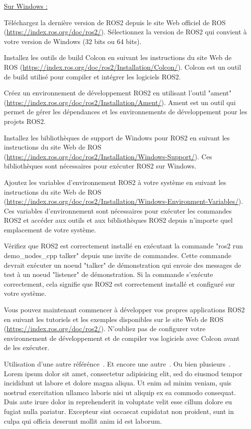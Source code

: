  \underline{Sur Windows :}
 
 
Téléchargez la dernière version de ROS2 depuis le site Web officiel de ROS (\url{https://index.ros.org/doc/ros2/}). Sélectionnez la version de ROS2 qui convient à votre version de Windows (32 bits ou 64 bits). 
 
Installez les outils de build Colcon en suivant les instructions du site Web de ROS (\url{https://index.ros.org/doc/ros2/Installation/Colcon/}). Colcon est un outil de build utilisé pour compiler et intégrer les logiciels ROS2. 
 
Créez un environnement de développement ROS2 en utilisant l'outil "ament" (\url{https://index.ros.org/doc/ros2/Installation/Ament/}). Ament est un outil qui permet de gérer les dépendances et les environnements de développement pour les projets ROS2. 
 
Installez les bibliothèques de support de Windows pour ROS2 en suivant les instructions du site Web de ROS (\url{https://index.ros.org/doc/ros2/Installation/Windows-Support/}). Ces bibliothèques sont nécessaires pour exécuter ROS2 sur Windows. 
 
Ajoutez les variables d'environnement ROS2 à votre système en suivant les instructions du site Web de ROS (\url{https://index.ros.org/doc/ros2/Installation/Windows-Environment-Variables/}). Ces variables d'environnement sont nécessaires pour exécuter les commandes ROS2 et accéder aux outils et aux bibliothèques ROS2 depuis n'importe quel emplacement de votre système. 
 
Vérifiez que ROS2 est correctement installé en exécutant la commande "ros2 run demo\_nodes\_cpp talker" depuis une invite de commandes. Cette commande devrait exécuter un noeud "talker" de démonstration qui envoie des messages de test à un noeud "listener" de démonstration. Si la commande s'exécute correctement, cela signifie que ROS2 est correctement installé et configuré sur votre système. 
 
Vous pouvez maintenant commencer à développer vos propres applications ROS2 en suivant les tutoriels et les exemples disponibles sur le site Web de ROS (\url{https://index.ros.org/doc/ros2/}). N'oubliez pas de configurer votre environnement de développement et de compiler vos logiciels avec Colcon avant de les exécuter. 
 

Utilisation d'une autre référénce~\cite{NOM05}. Et encore une autre~\cite{NOM12}. Ou bien plusieurs~\cite{WEB13, NOM09, NOM07}.
Lorem ipsum dolor sit amet, consectetur adipisicing elit, sed do eiusmod tempor incididunt ut labore et dolore magna aliqua. Ut enim ad minim veniam, quis nostrud exercitation ullamco laboris nisi ut aliquip ex ea commodo consequat. Duis aute irure dolor in reprehenderit in voluptate velit esse cillum dolore eu fugiat nulla pariatur. Excepteur sint occaecat cupidatat non proident, sunt in culpa qui officia deserunt mollit anim id est laborum.

